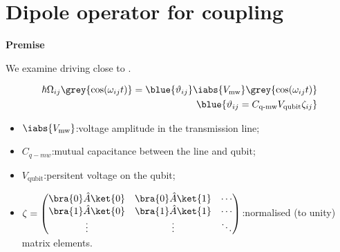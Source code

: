 \newpage
\section{Dipole     operator     for    coupling     \cite{Astafiev2010}
  \cite{abdumalikov2010} \label{sec:dipole_coupling}}

\begin{framed}\noindent
  \textbf{Premise}

  We examine driving close to \ilra{}.
\end{framed}

\begin{minipage}[l]{0.5\linewidth}%
  \begin{framed}\noindent
    \begin{equation}\label{eq:couple1}
      \begin{aligned}
        \hbar\Omega_{ij}\grey{\cos(\omega_{ij}t)} = \blue{\vartheta_{ij}}\iabs{V_\text{mw}}\grey{\cos(\omega_{ij}t)} & \\
        \blue{\vartheta_{ij} = C_\text{q-mw}V_\text{qubit}\zeta_{ij}} &
      \end{aligned}
    \end{equation}

    \begin{itemize}
    \item  $  \iabs{V_\text{mw}}  $:\hfill   voltage  amplitude  in  the
      transmission line;
    \item $  C_{q-mw} $:\hfill mutual  capacitance between the  line and
      qubit;
    \item $ V_\text{qubit} $:\hfill persitent voltage on the qubit;
    \item $ \zeta = \begin{pmatrix}
        \bra{0}\hat{A}\ket{0} & \bra{0}\hat{A}\ket{1} & \cdots\\
        \bra{1}\hat{A}\ket{0} & \bra{1}\hat{A}\ket{1} & \cdots\\
        \vdots & \vdots & \ddots
      \end{pmatrix} $:\hfill normalised (to unity) matrix elements.
    \end{itemize}%
  \end{framed}%
\end{minipage}%
